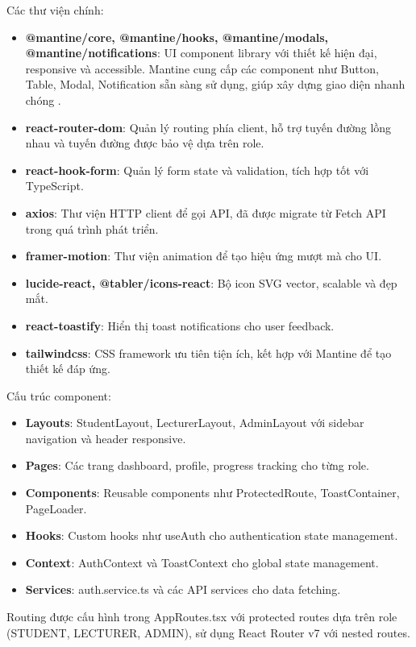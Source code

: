 \documentclass[conference,a4paper]{IEEEtran}
\begin{document}
Các thư viện chính:
\begin{itemize}
  \item \textbf{@mantine/core, @mantine/hooks, @mantine/modals, @mantine/notifications}: UI component library với thiết kế hiện đại, responsive và accessible. Mantine cung cấp các component như Button, Table, Modal, Notification sẵn sàng sử dụng, giúp xây dựng giao diện nhanh chóng \cite{li2022mantine}.
  \item \textbf{react-router-dom}: Quản lý routing phía client, hỗ trợ tuyến đường lồng nhau và tuyến đường được bảo vệ dựa trên role.
  \item \textbf{react-hook-form}: Quản lý form state và validation, tích hợp tốt với TypeScript.
  \item \textbf{axios}: Thư viện HTTP client để gọi API, đã được migrate từ Fetch API trong quá trình phát triển.
  \item \textbf{framer-motion}: Thư viện animation để tạo hiệu ứng mượt mà cho UI.
  \item \textbf{lucide-react, @tabler/icons-react}: Bộ icon SVG vector, scalable và đẹp mắt.
  \item \textbf{react-toastify}: Hiển thị toast notifications cho user feedback.
  \item \textbf{tailwindcss}: CSS framework ưu tiên tiện ích, kết hợp với Mantine để tạo thiết kế đáp ứng.
\end{itemize}

Cấu trúc component:
\begin{itemize}
  \item \textbf{Layouts}: StudentLayout, LecturerLayout, AdminLayout với sidebar navigation và header responsive.
  \item \textbf{Pages}: Các trang dashboard, profile, progress tracking cho từng role.
  \item \textbf{Components}: Reusable components như ProtectedRoute, ToastContainer, PageLoader.
  \item \textbf{Hooks}: Custom hooks như useAuth cho authentication state management.
  \item \textbf{Context}: AuthContext và ToastContext cho global state management.
  \item \textbf{Services}: auth.service.ts và các API services cho data fetching.
\end{itemize}

Routing được cấu hình trong AppRoutes.tsx với protected routes dựa trên role (STUDENT, LECTURER, ADMIN), sử dụng React Router v7 với nested routes.
\end{document}
